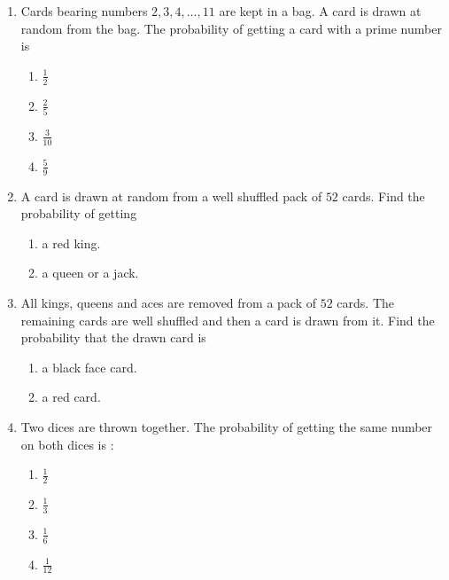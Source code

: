 \begin{enumerate}
\item Cards bearing numbers $2, 3, 4, \ldots, 11$ are kept in a bag. A card is drawn at random from the bag. The probability of getting a card with a prime number is\\
\begin{enumerate}
\item $\frac{1}{2}$\\
\item $\frac{2}{5}$\\
\item $\frac{3}{10}$\\
\item $\frac{5}{9}$\\
\end{enumerate}
\item A card is drawn at random from a well shuffled pack of $52$ cards. Find the probability of getting\\
\begin{enumerate}[label=\Roman*.]
\item a red king.\\
\item a queen or a jack.\\
\end{enumerate}
\item All kings, queens and aces are removed from a pack of $52$ cards. The remaining cards are well shuffled and then a card is drawn from it. Find the probability that the drawn card is \\
\begin{enumerate}[label=\Roman*.]
\item a black face card.\\
\item a red card.\\
\end{enumerate}
\item Two dices are thrown together. The probability of getting the same number on both dices is :\\
\begin{enumerate}
\item $\frac{1}{2}$\\
\item $\frac{1}{3}$\\
\item $\frac{1}{6}$\\
\item $\frac{1}{12}$\\

\end{enumerate}
\end{enumerate}
